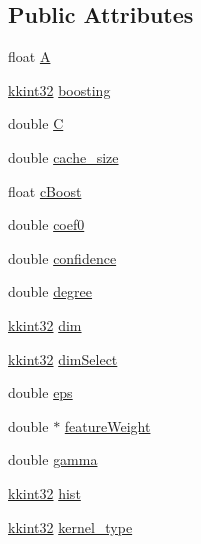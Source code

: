\subsection*{Public Attributes}
\begin{DoxyCompactItemize}
\item 
float \hyperlink{struct_s_v_m233_1_1svm__parameter_ae77c2459a4305fca375197165412abe2}{A}
\item 
\hyperlink{namespace_k_k_b_a8fa4952cc84fda1de4bec1fbdd8d5b1b}{kkint32} \hyperlink{struct_s_v_m233_1_1svm__parameter_a1c7bc0954f80166ddd404a5eb9e0ca99}{boosting}
\item 
double \hyperlink{struct_s_v_m233_1_1svm__parameter_a8b864fed529218604af5affb2184b20f}{C}
\item 
double \hyperlink{struct_s_v_m233_1_1svm__parameter_a38b5463e773456737b9a3c0621d75048}{cache\+\_\+size}
\item 
float \hyperlink{struct_s_v_m233_1_1svm__parameter_a6cc8bcc8a3a7194c22a892bc4a434402}{c\+Boost}
\item 
double \hyperlink{struct_s_v_m233_1_1svm__parameter_a50a9e4226133254cd1fd3bd57f8c6331}{coef0}
\item 
double \hyperlink{struct_s_v_m233_1_1svm__parameter_a760c2b49fb1bf53322de2476065ea2e1}{confidence}
\item 
double \hyperlink{struct_s_v_m233_1_1svm__parameter_abb71ffd3ed9223b5239971d18c59f6fe}{degree}
\item 
\hyperlink{namespace_k_k_b_a8fa4952cc84fda1de4bec1fbdd8d5b1b}{kkint32} \hyperlink{struct_s_v_m233_1_1svm__parameter_a5828bf6555280c5e3344618339b15ff2}{dim}
\item 
\hyperlink{namespace_k_k_b_a8fa4952cc84fda1de4bec1fbdd8d5b1b}{kkint32} \hyperlink{struct_s_v_m233_1_1svm__parameter_a58954ba2ce4bb3cbc2c61ab9f7a31c69}{dim\+Select}
\item 
double \hyperlink{struct_s_v_m233_1_1svm__parameter_a0805c5f7c672e3a2c36a278d513b674f}{eps}
\item 
double $\ast$ \hyperlink{struct_s_v_m233_1_1svm__parameter_a1e602e5cf093a3e36d340957656b091b}{feature\+Weight}
\item 
double \hyperlink{struct_s_v_m233_1_1svm__parameter_a39ac3a8cfe2358a6e58ef83ad301019a}{gamma}
\item 
\hyperlink{namespace_k_k_b_a8fa4952cc84fda1de4bec1fbdd8d5b1b}{kkint32} \hyperlink{struct_s_v_m233_1_1svm__parameter_a75623b8d630173a2333f37081e94ff13}{hist}
\item 
\hyperlink{namespace_k_k_b_a8fa4952cc84fda1de4bec1fbdd8d5b1b}{kkint32} \hyperlink{struct_s_v_m233_1_1svm__parameter_a262be7c9cc8bb14e8bd3476c19eb52dc}{kernel\+\_\+type}

\end{DoxyCompactItemize}
